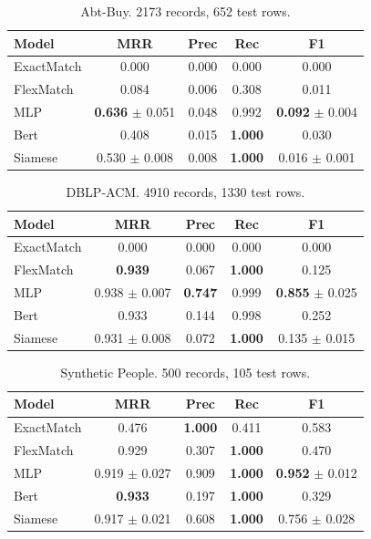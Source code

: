 \documentclass[10pt,letterpaper]{article}
\begin{document}
\begin{table}[t]
\centering
\caption{Abt-Buy. 2173 records, 652 test rows.}
\label{tab:ab}
\small
\begin{tabular}{lcccc}
\toprule
Model & MRR & Prec & Rec & F1 \\
\midrule
ExactMatch & 0.000 & 0.000 & 0.000 & 0.000 \\
FlexMatch  & 0.084 & 0.006 & 0.308 & 0.011 \\
MLP        & \textbf{0.636} \scriptsize{$\pm$ 0.051} & 0.048 & 0.992 & \textbf{0.092} \scriptsize{$\pm$ 0.004} \\
Bert       & 0.408 & 0.015 & \textbf{1.000} & 0.030 \\
Siamese    & 0.530 \scriptsize{$\pm$ 0.008} & 0.008 & \textbf{1.000} & 0.016 \scriptsize{$\pm$ 0.001} \\
\bottomrule
\end{tabular}
\end{table}

\begin{table}[t]
\centering
\caption{DBLP-ACM. 4910 records, 1330 test rows.}
\label{tab:dblp}
\small
\begin{tabular}{lcccc}
\toprule
Model & MRR & Prec & Rec & F1 \\
\midrule
ExactMatch & 0.000 & 0.000 & 0.000 & 0.000 \\
FlexMatch  & \textbf{0.939} & 0.067 & \textbf{1.000} & 0.125 \\
MLP        & 0.938 \scriptsize{$\pm$ 0.007} & \textbf{0.747} & 0.999 & \textbf{0.855} \scriptsize{$\pm$ 0.025} \\
Bert       & 0.933 & 0.144 & 0.998 & 0.252 \\
Siamese    & 0.931 \scriptsize{$\pm$ 0.008} & 0.072 & \textbf{1.000} & 0.135 \scriptsize{$\pm$ 0.015} \\
\bottomrule
\end{tabular}
\end{table}

\begin{table}[t]
\centering
\caption{Synthetic People. 500 records, 105 test rows.}
\label{tab:syn}
\small
\begin{tabular}{lcccc}
\toprule
Model & MRR & Prec & Rec & F1 \\
\midrule
ExactMatch & 0.476 & \textbf{1.000} & 0.411 & 0.583 \\
FlexMatch  & 0.929 & 0.307 & \textbf{1.000} & 0.470 \\
MLP        & 0.919 \scriptsize{$\pm$ 0.027} & 0.909 & \textbf{1.000} & \textbf{0.952} \scriptsize{$\pm$ 0.012} \\
Bert       & \textbf{0.933} & 0.197 & \textbf{1.000} & 0.329 \\
Siamese    & 0.917 \scriptsize{$\pm$ 0.021} & 0.608 & \textbf{1.000} & 0.756 \scriptsize{$\pm$ 0.028} \\
\bottomrule
\end{tabular}
\end{table}
\end{document}
